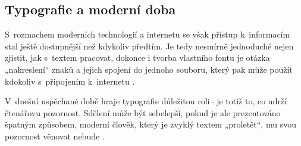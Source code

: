 \documentclass[11pt, a4paper, titlepage]{article}
\begin{document}
\subsection{Typografie a moderní doba}
S~rozmachem moderních technologií a internetu se však přístup k~informacím stal ještě dostupnější než kdykoliv předtím. Je tedy nesmírně jednoduché nejen zjistit, jak s~textem pracovat, dokonce i tvorba vlastního fontu je otázka „nakreslení“ znaků a jejich spojení do jednoho souboru, který pak může použít kdokoliv s~připojením k~internetu \cite{FontGuide}.

V~dnešní uspěchané době hraje typografie důležitou roli\,--\,je totiž to, co udrží čtenářovu pozornost. Sdělení může být sebelepší, pokud je ale prezentováno špatným způsobem, moderní člověk, který je zvyklý textem „proletět“, mu svou pozornost věnovat nebude \cite{TypographyPsychological}.

\newpage

\end{document}
